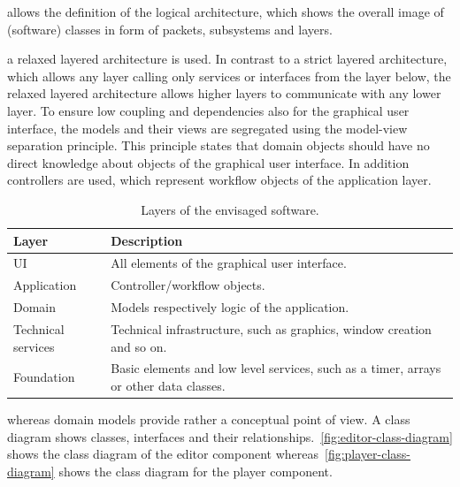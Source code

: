 \documentclass[%
    a4paper,    %
    justified,  %
    nobib,      %
    openany     %
]{tufte-book}
\begin{document}
 allows the
definition of the logical architecture, which shows the overall image of
(software) classes in form of packets, subsystems and layers.

 a relaxed layered architecture
is used. In contrast to a strict layered architecture, which allows any layer
calling only services or interfaces from the layer below, the relaxed layered
architecture allows higher layers to communicate with any lower layer. To ensure
low coupling and dependencies also for the graphical user interface, the models
and their views are segregated using the model-view separation principle. This
principle states that domain objects should have no direct knowledge about
objects of the graphical user interface. In addition controllers are used, which
represent workflow objects of the application layer.

\begin{table}[h]
  \caption{Layers of the envisaged software.}
  \label{table:layers}
  \begin{tabularx}{\textwidth}{lX}
    \toprule
    \textbf{Layer} & \textbf{Description}\\
    \midrule
    UI & All elements of the graphical user interface.\\
    Application & Controller/workflow objects.\\
    Domain & Models respectively logic of the application.\\
    Technical services & Technical infrastructure, such as graphics, window
    creation and so on.\\
    Foundation & Basic elements and low level services, such as a timer, arrays
    or other data classes.\\
    \bottomrule
  \end{tabularx}
\end{table}

 whereas domain
models provide rather a conceptual point of view. A class diagram shows classes,
interfaces and their relationships.~\autoref{fig:editor-class-diagram} shows the
class diagram of the editor component whereas~\autoref{fig:player-class-diagram}
shows the class diagram for the player component.
\end{document}
